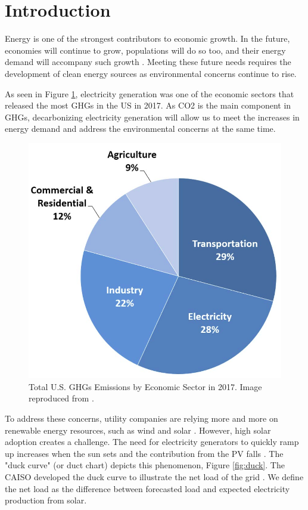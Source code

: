 \documentclass[11pt,letterpaper]{article}
\begin{document}
\section{Introduction}

Energy is one of the strongest contributors to economic growth.
In the future, economies will continue to grow, populations will do so too, and their energy demand will accompany such growth \cite{burke_impact_2018} \cite{el-shafie_hydrogen_2019}.
Meeting these future needs requires the development of clean energy sources as environmental concerns continue to rise.

As seen in Figure \ref{fig:ghg}, electricity generation was one of the economic sectors that released the most \glspl{GHG} in the \gls{US} in 2017.
As \gls{CO2} is the main component in \glspl{GHG}, decarbonizing electricity generation will allow us to meet the increases in energy demand and address the environmental concerns at the same time.

\begin{figure}[htbp!]
	\centering
	\includegraphics[width=0.6\linewidth]{figures/total-ghg-2017.png}
	\hfill
	\caption{Total U.S. \glspl{GHG} Emissions by Economic Sector in 2017. Image reproduced from \cite{us_epa_sources_2020}.}
	\label{fig:ghg}
\end{figure}

To address these concerns, utility companies are relying more and more on renewable energy resources, such as wind and solar \cite{ming_resource_2019}.
However, high solar adoption creates a challenge.
The need for electricity generators to quickly ramp up increases when the sun sets and the contribution from the \gls{PV} falls \cite{us_department_of_energy_confronting_2017}.
The "duck curve" (or duct chart) depicts this phenomenon, Figure \ref{fig:duck}.
The \gls{CAISO} developed the duck curve to illustrate the net load of the grid \cite{bouillon_prepared_2014}.
We define the net load as the difference between forecasted load and expected electricity production from solar.
\end{document}
